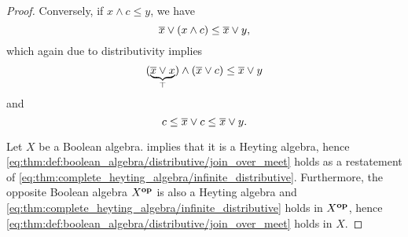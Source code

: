 \begin{proof}
  Conversely, if \( x \wedge c \leq y \), we have
  \begin{equation*}
    \oline x \vee (x \wedge c) \leq \oline x \vee y,
  \end{equation*}
  which again due to distributivity implies
  \begin{equation*}
    (\underbrace{\oline x \vee x}_{\top}) \wedge (\oline x \vee c) \leq \oline x \vee y
  \end{equation*}
  and
  \begin{equation*}
    c \leq \oline x \vee c \leq \oline x \vee y.
  \end{equation*}

   Let \( X \) be a Boolean algebra.  implies that it is a Heyting algebra, hence \eqref{eq:thm:def:boolean_algebra/distributive/join_over_meet} holds as a restatement of \eqref{eq:thm:complete_heyting_algebra/infinite_distributive}. Furthermore, the opposite Boolean algebra \( X^\oppos \) is also a Heyting algebra and \eqref{eq:thm:complete_heyting_algebra/infinite_distributive} holds in \( X^\oppos \), hence \eqref{eq:thm:def:boolean_algebra/distributive/join_over_meet} holds in \( X \).
\end{proof}

